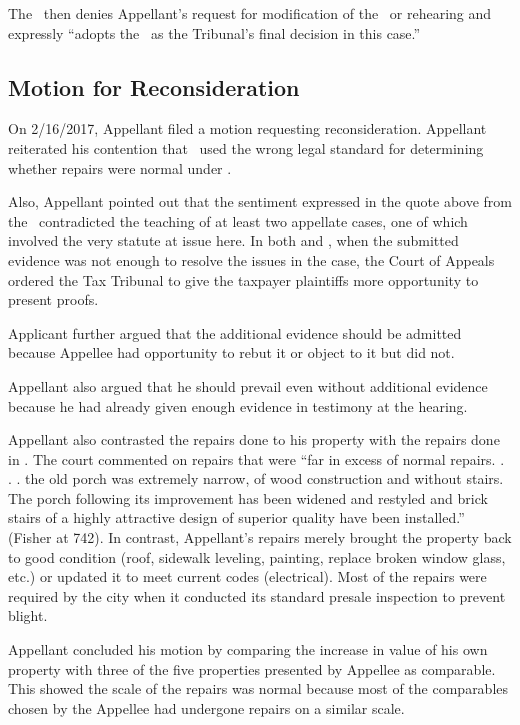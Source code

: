 \documentclass[12pt,\documentclassflag]{michiganCourtOfAppealsBrief}
\def\mathieuGast{\pincite[l]{MCL}{211.27(2)}}
\begin{document}
The \FOJ\ then denies Appellant's request for modification of the \POJ\ or rehearing and expressly ``adopts the \POJ\ as the Tribunal's final decision in this case.''

\subsection{Motion for Reconsideration}

On 2/16/2017, Appellant filed a motion requesting reconsideration. Appellant reiterated his contention that \POJ\ used the wrong legal standard for determining whether repairs were normal under \mathieuGast.

Also, Appellant pointed out that the sentiment expressed in the quote above from the \FOJ\ contradicted the teaching of at least two appellate cases, one of which involved the very statute at issue here. In both \cite{Jones & Laughlin} and \cite[s]{Fisher}, when the submitted evidence was not enough to resolve the issues in the case, the Court of Appeals ordered the Tax Tribunal to give the taxpayer plaintiffs more opportunity to present proofs. 

Applicant further argued that the additional evidence should be admitted because Appellee had opportunity to rebut it or object to it but did not.

Appellant also argued that he should prevail even without additional evidence because  he had already given enough evidence in testimony at the hearing.

Appellant also contrasted the repairs done to his property with the repairs done in \cite[s]{Fisher}. The court commented on repairs that were ``far in excess of normal repairs. . . . the old porch was extremely narrow, of wood construction and without stairs. The porch following its improvement has been widened and restyled and brick stairs of a highly attractive design of superior quality have been installed.'' (Fisher at 742). In contrast, Appellant's repairs merely brought the property back to good condition (roof, sidewalk leveling, painting, replace broken window glass, etc.) or updated it to meet current codes (electrical). Most of the repairs were required by the city when it conducted its standard presale inspection to prevent blight.

Appellant concluded his motion by comparing the increase in value of his own property with three of the five properties presented by Appellee as comparable. This showed the scale of the repairs was normal because most of the comparables chosen by the Appellee had undergone repairs on a similar scale.
\end{document}
